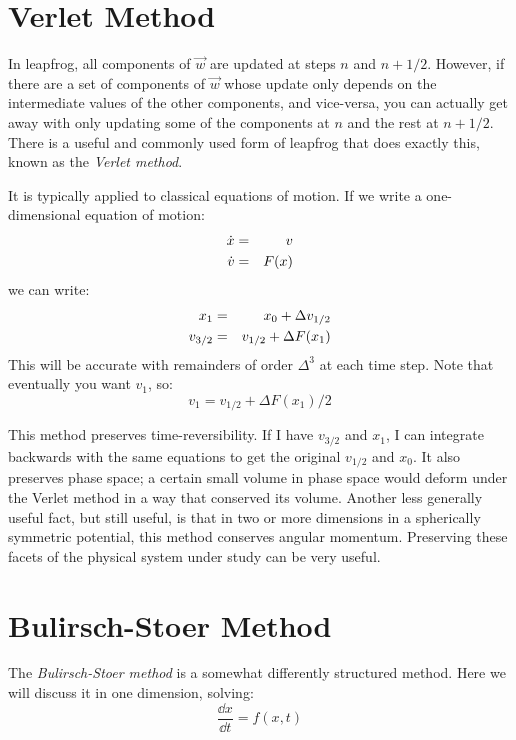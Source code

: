 \section{Verlet Method}

In leapfrog, all components of $\vec{w}$ are updated at steps $n$ and
$n+1/2$. However, if there are a set of components of $\vec{w}$ whose
update only depends on the intermediate values of the other
components, and vice-versa, you can actually get away with only
updating some of the components at $n$ and the rest at $n+1/2$. There
is a useful and commonly used form of leapfrog that does exactly this,
known as the {\it Verlet method}.

It is typically applied to classical equations of motion. If we write
a one-dimensional equation of motion:
\begin{eqnarray}
{\dot x} &=& v \cr
{\dot v} &=& F(x)
\end{eqnarray}
we can write: 
\begin{eqnarray}
x_1 &=& x_0 + \Delta v_{1/2} \cr
v_{3/2} &=& v_{1/2} + \Delta F(x_1)
\end{eqnarray}
This will be accurate with remainders of order $\Delta^3$ at each time
step. Note that eventually you want $v_1$, so:
\begin{equation}
v_{1} = v_{1/2} + \Delta F(x_1) / 2
\end{equation}

This method preserves time-reversibility. If I have $v_{3/2}$ and
$x_1$, I can integrate backwards with the same equations to get the
original $v_{1/2}$ and $x_0$. It also preserves phase space; a certain
small volume in phase space would deform under the Verlet method in a
way that conserved its volume. Another less generally useful fact, but
still useful, is that in two or more dimensions in a spherically
symmetric potential, this method conserves angular
momentum. Preserving these facets of the physical system under study
can be very useful.

\section{Bulirsch-Stoer Method}

The {\it Bulirsch-Stoer method} is a somewhat differently structured
method. Here we will discuss it in one dimension, solving:
\begin{equation}
\frac{\dd{x}}{\dd{t}} = f(x,t)
\end{equation}

